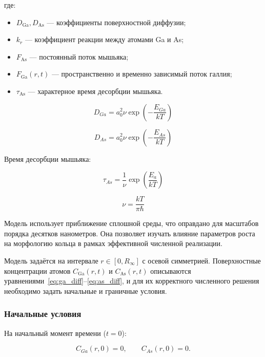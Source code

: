 \documentclass[14pt,oneside]{extarticle}
\begin{document}
где:
\begin{itemize}
  \item $D_{\text{Ga}}, D_{\text{As}}$ — коэффициенты поверхностной диффузии;
  \item $k_{r}$ — коэффициент реакции между атомами Ga и As;
  \item $F_{\text{As}}$ — постоянный поток мышьяка;
  \item $F_{\text{Ga}}(r,t)$ — пространственно и временно зависимый поток галлия;
  \item $\tau_{\text{As}}$ — характерное время десорбции мышьяка.
\end{itemize}

\begin{equation}
D_{Ga}=a_{0}^{2}\nu\exp\left(-\frac{E_{Ga}}{kT}\right)
\end{equation}

\begin{equation}
D_{As}=a_{0}^{2}\nu\exp\left(-\frac{E_{As}}{kT}\right)
\end{equation}

Время десорбции мышьяка:

\begin{equation}
\tau_{As}=\frac{1}{\nu}\exp\left(\frac{E_{a}}{kT}\right)
\end{equation}

\begin{equation}
\nu=\frac{kT}{\pi\hbar}
\end{equation}

Модель использует приближение сплошной среды, что оправдано для масштабов порядка десятков нанометров. Она позволяет изучать влияние параметров роста на морфологию кольца в рамках эффективной численной реализации.

Модель задаётся на интервале $r \in [0, R_\infty]$ с осевой симметрией. Поверхностные концентрации атомов $C_{\text{Ga}}(r,t)$ и $C_{\text{As}}(r,t)$ описываются уравнениями~\eqref{eq:ga_diff}–\eqref{eq:as_diff}, и для их корректного численного решения необходимо задать начальные и граничные условия.

\subsubsection*{Начальные условия}

На начальный момент времени ($t = 0$): 

\begin{equation}
C_{Ga}\left(r,0\right)=0, \qquad
C_{As}\left(r,0\right)=0.
\end{equation}
\end{document}

